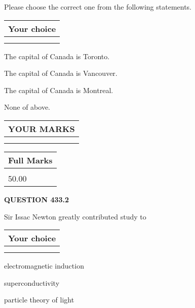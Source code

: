 \documentclass[12pt]{article}
\begin{document}
  
Please choose the correct one from the following statements.
  
  
\noindent\hspace{3.0in} \begin{tabular}{|l|}
\hline
Your choice \\
\hline
 \\ 
 \\ 
\hline
\end{tabular}
  
  
 
 
The capital of Canada is Toronto.
 
 
The capital of Canada is Vancouver.
 
 
The capital of Canada is Montreal.
 
 
 None of above.
 
 
  
\vspace{0.2in}
  
\noindent\begin{tabular}{|l|}
\hline
 YOUR MARKS  \\
\hline
 \\ 
 \\ 
\hline
\end{tabular}
\hspace{0.05in} \begin{tabular}{|l|}
\hline
 Full Marks  \\
\hline
 \\ 
50.00 \\
\hline
\end{tabular}
{\textbf{\Large{QUESTION
433.2 
}}}
  
  
Sir Issac Newton greatly contributed study to
  
  
\noindent\hspace{3.0in} \begin{tabular}{|l|}
\hline
Your choice \\
\hline
 \\ 
 \\ 
\hline
\end{tabular}
  
  
 
 
electromagnetic induction
 
 
superconductivity
 
 
particle theory of light
 
\end{document}
